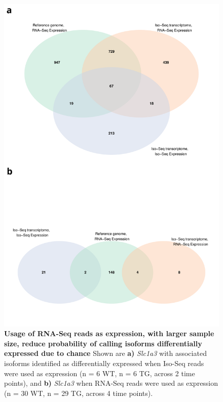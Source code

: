 \begin{figure}[!htp]
	\centering
	\includegraphics[page=17,trim={0cm 20cm 0cm 0cm},clip,scale = 0.55]{Figures/WholeDifferentialAnalysis.pdf}
	\captionsetup{width=0.95\textwidth}
	\caption[Differential Isoform Expression observed in isoforms with high expression but large variance]%
	{\textbf{Usage of RNA-Seq reads as expression, with larger sample size, reduce probability of calling isoforms differentially expressed due to chance} Shown are \textbf{a)} \textit{Slc1a3} with associated isoforms identified as differentially expressed when Iso-Seq reads were used as expression (n = 6 WT, n = 6 TG, across 2 time points), and \textbf{b)} \textit{Slc1a3} when RNA-Seq reads were used as expression (n = 30 WT, n = 29 TG, across 4 time points). 
	\\
}
\end{figure}
